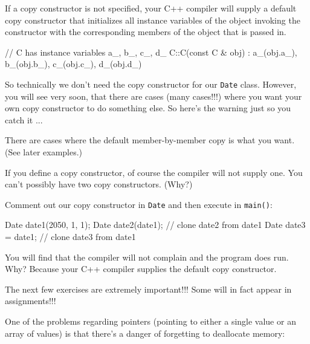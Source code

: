 \newpage{}

If a copy constructor is not specified, your C++ compiler will supply a
default copy constructor that initializes all instance variables of the
object invoking the constructor with the corresponding members of the
object that is passed in.

\begin{consolethree}[escapeinside=||]
// C has instance variables a_, b_, c_, d_
C::C(const C & obj)
    : a_(obj.a_), b_(obj.b_), c_(obj.c_), d_(obj.d_)
{}
\end{consolethree}

So technically we don't need the copy constructor for our \texttt{Date}
class. However, you will see very soon, that there are cases (many
cases!!!) where you want your own copy constructor to do something else.
So here's the warning just so you catch it ...

 There are cases where the default member-by-member
copy is  what you want. (See later examples.)

If you define a copy constructor, of course the compiler will not supply
one. You can't possibly have two copy constructors. (Why?)

Comment out our copy constructor in \texttt{Date} and then execute in
\texttt{main()}:

\begin{consolethree}[escapeinside=||]
Date date1(2050, 1, 1);
Date date2(date1);  // clone date2 from date1
Date date3 = date1; // clone date3 from date1
\end{consolethree}

You will find that the compiler will not complain and the program does
run. Why? Because your C++ compiler supplies the default copy
constructor.







\newpage{}

The next few exercises are extremely important!!! Some will in fact
appear in assignments!!!

One of the problems regarding pointers (pointing to either a single
value or an array of values) is that there's a danger of forgetting to
deallocate memory:

